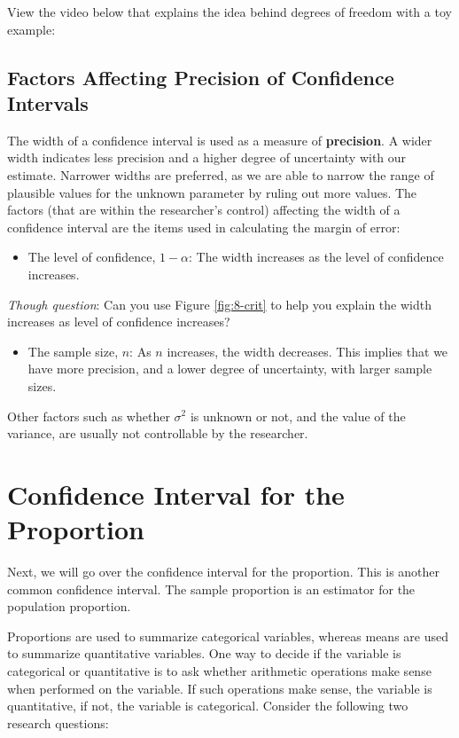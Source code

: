 \documentclass[
]{book}
\providecommand{\tightlist}{%
  \setlength{\itemsep}{0pt}\setlength{\parskip}{0pt}}
\begin{document}
View the video below that explains the idea behind degrees of freedom with a toy example:

\hypertarget{factors-affecting-precision-of-confidence-intervals}{%
\subsection{Factors Affecting Precision of Confidence Intervals}\label{factors-affecting-precision-of-confidence-intervals}}

The width of a confidence interval is used as a measure of \textbf{precision}. A wider width indicates less precision and a higher degree of uncertainty with our estimate. Narrower widths are preferred, as we are able to narrow the range of plausible values for the unknown parameter by ruling out more values. The factors (that are within the researcher's control) affecting the width of a confidence interval are the items used in calculating the margin of error:

\begin{itemize}
\tightlist
\item
  The level of confidence, \(1 - \alpha\): The width increases as the level of confidence increases.
\end{itemize}

\emph{Though question}: Can you use Figure \ref{fig:8-crit} to help you explain the width increases as level of confidence increases?

\begin{itemize}
\tightlist
\item
  The sample size, \(n\): As \(n\) increases, the width decreases. This implies that we have more precision, and a lower degree of uncertainty, with larger sample sizes.
\end{itemize}

Other factors such as whether \(\sigma^2\) is unknown or not, and the value of the variance, are usually not controllable by the researcher.

\hypertarget{CIprop}{%
\section{Confidence Interval for the Proportion}\label{CIprop}}

Next, we will go over the confidence interval for the proportion. This is another common confidence interval. The sample proportion is an estimator for the population proportion.

Proportions are used to summarize categorical variables, whereas means are used to summarize quantitative variables. One way to decide if the variable is categorical or quantitative is to ask whether arithmetic operations make sense when performed on the variable. If such operations make sense, the variable is quantitative, if not, the variable is categorical. Consider the following two research questions:
\end{document}
